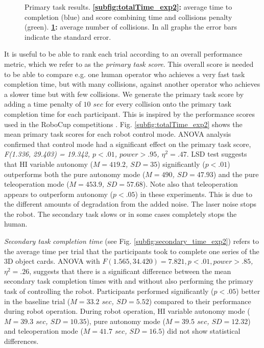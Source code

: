 \documentclass[a4paper,12pt,oneside,openright]{bhamthesis}
\begin{document}
\begin{figure}
\begin{subfigure}[b]{0.49\textwidth}
			\caption{}
			\label{subfig:totalCollisions_exp2}
		\end{subfigure}
		\hfill
		\caption{Primary task results. \textbf{\ref{subfig:totalTime_exp2}:} average time to completion (blue) and score combining time and collisions penalty (green). \textbf{\ref{subfig:totalCollisions_exp2}:} average number of collisions. In all graphs the error bars indicate the standard error.}
		\label{fig:time_collisions_exp2}
	\end{figure}
	
It is useful to be able to rank each trial according to an overall performance metric, which we refer to as the \textit{primary task score}. This overall score is needed to be able to compare e.g. one human operator who achieves a very fast task completion time, but with many collisions, against another operator who achieves a slower time but with few collisions. We generate the primary task score by adding a time penalty of \textit{$10$ $sec$} for every collision onto the primary task completion time for each participant. This is inspired by the performance scores used in the RoboCup competitions \cite{Jacoff2003a}. Fig. \ref{subfig:totalTime_exp2} shows the mean primary task scores for each robot control mode. ANOVA analysis confirmed that control mode had a significant effect on the primary task score, \textit{F(1.336, 29.403) = 19.342, $p < .01$, $power > .95$, $\eta^2 = .47$}. LSD test suggests that HI variable autonomy (\textit{$M = 419.2$, $SD = 35$}) significantly (\textit{$p <.01$}) outperforms both the pure autonomy mode (\textit{$M = 490$, $SD = 47.93$}) and the pure teleoperation mode (\textit{$M = 453.9$, $SD = 57.68$}). Note also that teleoperation appears to outperform autonomy (\textit{$p <.05$}) in these experiments. This is due to the different amounts of degradation from the added noise. The laser noise stops the robot. The secondary task slows or in some cases completely stops the human.

\textit{Secondary task completion time} (see Fig. \ref{subfig:secondary_time_exp2}) refers to the average time per trial that the participants took to complete one series of the 3D object cards. ANOVA with \textit{$F(1.565, 34.420) = 7.821, p < .01 , power > .85$, $\eta^2 = .26$}, suggests that there is a significant difference between the mean secondary task completion times with and without also performing the primary task of controlling the robot. Participants performed significantly ($p < .05$) better in the baseline trial (\textit{$M = 33.2$ $sec$, $SD = 5.52$}) compared to their performance during robot operation. During robot operation, HI variable autonomy mode (\textit{$M = 39.3$ $sec$, $SD = 10.35$}), pure autonomy mode (\textit{$M = 39.5$ $sec$, $SD = 12.32$}) and teleoperation mode (\textit{$M = 41.7$ $sec$, $SD = 16.5$}) did not show statistical differences.
\end{document}
